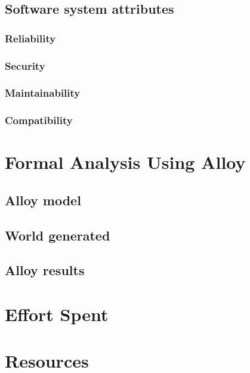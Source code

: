 \documentclass{article}
\begin{document}
\subsection{Software system attributes}
\subsubsection{Reliability}
\subsubsection{Security}
\subsubsection{Maintainability}
\subsubsection{Compatibility}
\section{Formal Analysis Using Alloy}
\subsection{Alloy model}
\subsection{World generated}
\subsection{Alloy results}
\section{Effort Spent}
\section{Resources}
\end{document}
